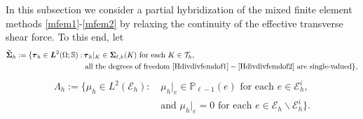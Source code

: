 In this subsection we consider a partial hybridization of the mixed finite element methods \eqref{mfem1}-\eqref{mfem2} by relaxing the continuity of the effective transverse shear force.
To this end, let
\begin{align*}
\widetilde{\boldsymbol\Sigma}_h:=\{\boldsymbol \tau_h\in \boldsymbol  L^2(\Omega;\mathbb S):&\, \boldsymbol \tau_h|_K\in \boldsymbol \Sigma_{\ell,k}(K) \textrm{ for each } K\in\mathcal T_h, \\
& \textrm{ all the degrees of freedom } \eqref{Hdivdivfemdof1}-\eqref{Hdivdivfemdof2} \textrm{ are single-valued}\},
\end{align*}
\begin{align*}
\Lambda_h:=\{\mu_h\in L^2(\mathcal E_h):& \, \mu_h|_e\in\mathbb P_{\ell-1}(e) \textrm{ for each } e\in\mathcal E_h^i,\\
 & \,\textrm{and } \mu_h|_e=0 \textrm{ for each } e\in\mathcal E_h\backslash\mathcal E_h^i \}.
\end{align*}

